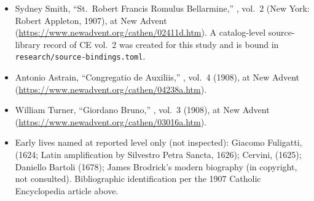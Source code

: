 \begin{itemize}
\item Sydney Smith, ``St.~Robert Francis Romulus Bellarmine,''
, vol.~2 (New York: Robert
Appleton, 1907), at New Advent
(\url{https://www.newadvent.org/cathen/02411d.htm}). A
catalog-level source-library record of CE vol.~2 was created for
this study and is bound in \texttt{research/source-bindings.toml}.
\item Antonio Astrain, ``Congregatio de Auxiliis,'' , vol.~4 (1908), at New Advent
(\url{https://www.newadvent.org/cathen/04238a.htm}).
\item William Turner, ``Giordano Bruno,'' , vol.~3 (1908), at New Advent
(\url{https://www.newadvent.org/cathen/03016a.htm}).
\item Early lives named at reported level only (not inspected):
Giacomo Fuligatti, 
(1624; Latin amplification by Silvestro Petra Sancta, 1626);
Cervini,  (1625); Daniello Bartoli (1678);
James Brodrick's modern biography (in copyright, not consulted).
Bibliographic identification per the 1907 Catholic Encyclopedia
article above.
\end{itemize}

\endgroup
